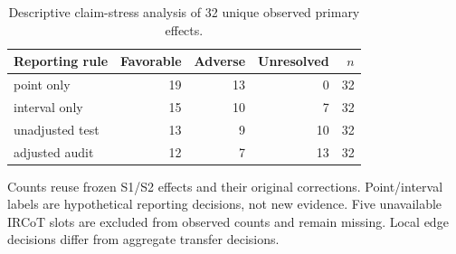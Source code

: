 \begin{table}[!htbp]
\centering\footnotesize
\caption{Descriptive claim-stress analysis of 32 unique observed primary effects.}
\label{tab:claim_stress}
\begin{threeparttable}
\setlength{\tabcolsep}{3pt}
\begin{tabular}{lrrrr}
\toprule
Reporting rule & Favorable & Adverse & Unresolved & $n$ \\
\midrule
point only & 19 & 13 & 0 & 32 \\
interval only & 15 & 10 & 7 & 32 \\
unadjusted test & 13 & 9 & 10 & 32 \\
adjusted audit & 12 & 7 & 13 & 32 \\
\bottomrule
\end{tabular}
\begin{tablenotes}\scriptsize\item Counts reuse frozen S1/S2 effects and their original corrections. Point/interval labels are hypothetical reporting decisions, not new evidence. Five unavailable IRCoT slots are excluded from observed counts and remain missing. Local edge decisions differ from aggregate transfer decisions.
\end{tablenotes}
\end{threeparttable}
\end{table}
